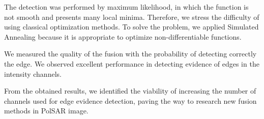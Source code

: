 \documentclass[conference]{IEEEtran}
\begin{document}
The detection was performed by maximum likelihood, in which the function is not smooth and presents many local minima.
Therefore, we stress the difficulty of using classical optimization methods. 
To solve the problem, we applied Simulated Annealing because it is appropriate to optimize non-differentiable functions.

We measured the quality of the fusion with the probability of detecting correctly the edge.
We observed excellent performance in detecting evidence of edges in the intensity channels.

From the obtained results, we identified the viability of increasing the number of channels used for edge evidence detection, paving the way to research new fusion methods in PolSAR image.



\end{document}
